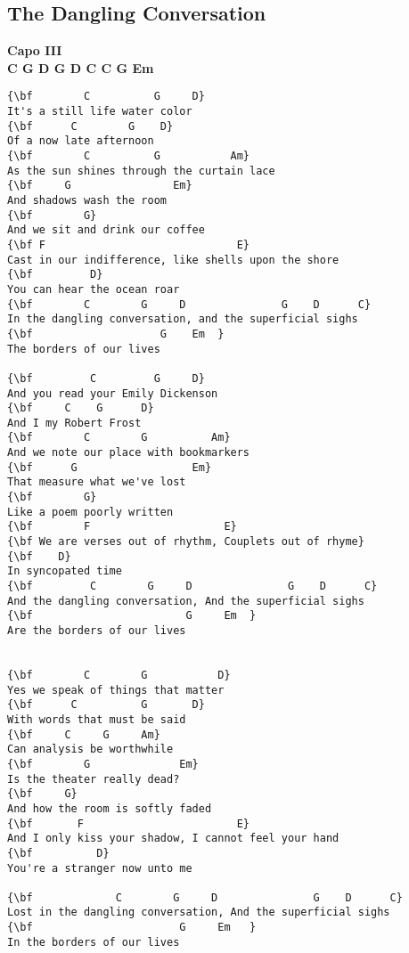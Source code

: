 \documentclass[a4paper]{article}
\begin{document}
\subsection{The Dangling Conversation} %
\label{sub:The Dangling Conversatio}
{\bf Capo III} \\
{\bf C G D  G D C  C G Em}
\begin{Verbatim}[commandchars=\\\{\}]
{\bf        C          G     D}
It's a still life water color
{\bf      C        G    D}
Of a now late afternoon
{\bf        C          G           Am}
As the sun shines through the curtain lace
{\bf     G                Em}
And shadows wash the room
{\bf        G}
And we sit and drink our coffee
{\bf F                              E}
Cast in our indifference, like shells upon the shore
{\bf         D}
You can hear the ocean roar
{\bf        C        G     D               G    D      C}
In the dangling conversation, and the superficial sighs
{\bf                    G    Em  }
The borders of our lives

{\bf         C         G     D}
And you read your Emily Dickenson
{\bf     C    G      D}
And I my Robert Frost
{\bf        C        G          Am}
And we note our place with bookmarkers
{\bf      G                  Em}
That measure what we've lost
{\bf        G}
Like a poem poorly written
{\bf        F                     E}
{\bf We are verses out of rhythm, Couplets out of rhyme}
{\bf    D}
In syncopated time
{\bf         C        G     D               G    D      C}
And the dangling conversation, And the superficial sighs
{\bf                        G     Em  }
Are the borders of our lives


{\bf        C        G           D}
Yes we speak of things that matter
{\bf      C          G       D}
With words that must be said
{\bf     C     G     Am}
Can analysis be worthwhile
{\bf        G              Em}
Is the theater really dead?
{\bf     G}
And how the room is softly faded
{\bf       F                        E}
And I only kiss your shadow, I cannot feel your hand
{\bf          D}
You're a stranger now unto me

{\bf             C        G     D               G    D      C}
Lost in the dangling conversation, And the superficial sighs
{\bf                       G     Em   }
In the borders of our lives
\end{Verbatim}
\newpage
\end{document}
